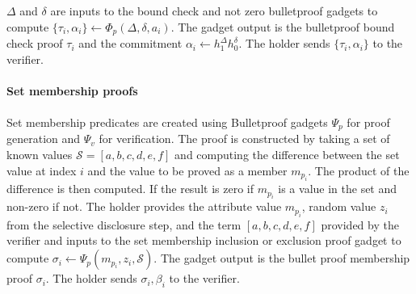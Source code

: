 \documentclass[a4paper]{article}
\begin{document}
$\Delta$ and $\delta$ are inputs to the bound check and not zero bulletproof gadgets to compute $\{\tau_i, \alpha_i\} \leftarrow \Phi_p(\Delta, \delta, a_i)$. The gadget output is the bulletproof bound check proof $\tau_i$ and the commitment $\alpha_i\leftarrow h_1^{\Delta}h_0^{\delta}$.
The holder sends $\{\tau_i, \alpha_i\}$ to the verifier.\\\\
\textbf{Set membership proofs}\\\\
Set membership predicates are created using Bulletproof gadgets $\Psi_p$ for proof generation and $\Psi_v$ for verification. The proof is constructed by taking a set of known values $\mathcal{S} = [a, b, c, d, e, f]$ and computing the difference between the set value at index $i$ and the value to be proved as a member $m_{p_i}$. The product of the difference is then computed. If the result is zero if $m_{p_i}$ is a value in the set and non-zero if not.
The holder provides the attribute value $m_{p_i}$, random value $z_i$ from the selective disclosure step, and the term $[a, b, c, d, e, f]$ provided by the verifier and inputs to the set membership inclusion or exclusion proof gadget to compute $\sigma_i\leftarrow \Psi_p(m_{p_i}, z_i, \mathcal{S})$. The gadget output is the bullet proof membership proof $\sigma_i$. The holder sends $\sigma_i, \beta_i$ to the verifier.
\end{document}
